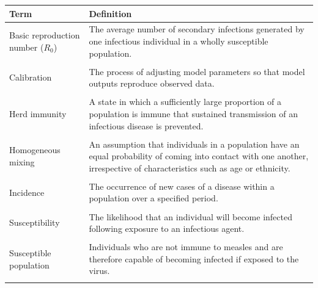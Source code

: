 \documentclass[12pt]{article}
\newcounter{who}
\begin{document}
\newpage
\tableofcontents


\newpage

\begin{table}[ht!]
    \centering
    \label{tab:key-terms}
    \begin{tabularx}{\linewidth}{lX}
        \toprule
        \textbf{Term} & \textbf{Definition} \\
        \midrule
        Basic reproduction number ($R_0$) &
        The average number of secondary infections generated by one infectious individual in a wholly susceptible population. \\\\

        Calibration &
        The process of adjusting model parameters so that model outputs reproduce observed data. \\\\


        Herd immunity &
        A state in which a sufficiently large proportion of a population is immune that sustained transmission of an infectious disease is prevented. \\\\

        Homogeneous mixing &
        An assumption that individuals in a population have an equal probability of coming into contact with one another, irrespective of characteristics such as age or ethnicity. \\\\

        Incidence &
        The occurrence of new cases of a disease within a population over a specified period. \\\\

        Susceptibility &
        The likelihood that an individual will become infected following exposure to an infectious agent. \\\\

        Susceptible population &
        Individuals who are not immune to measles and are therefore capable of becoming infected if exposed to the virus. \\\\


\end{tabularx}
\end{table}
\end{document}
